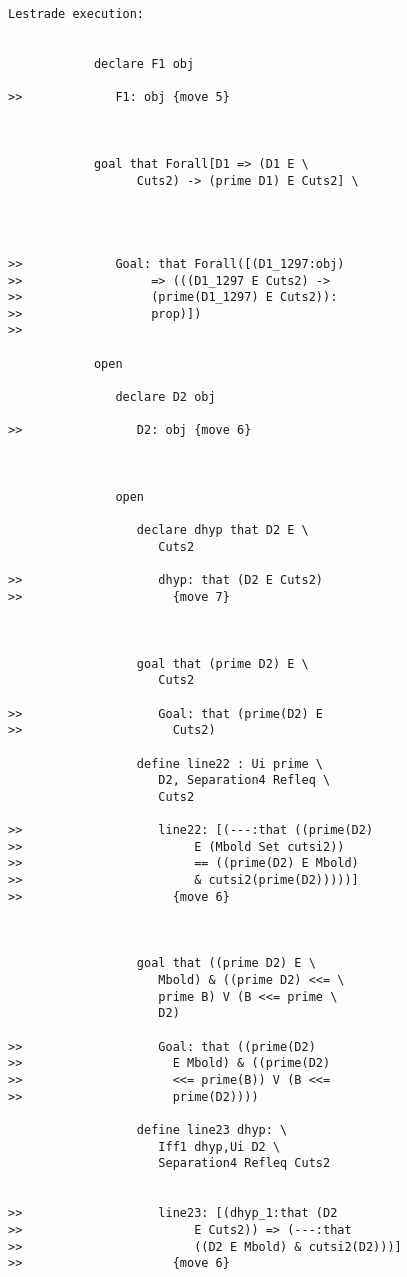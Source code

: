 \documentclass[12pt]{article}
\begin{document}
\begin{verbatim}Lestrade execution:


            declare F1 obj

>>             F1: obj {move 5}



            goal that Forall[D1 => (D1 E \
                  Cuts2) -> (prime D1) E Cuts2] \
               



>>             Goal: that Forall([(D1_1297:obj)
>>                  => (((D1_1297 E Cuts2) ->
>>                  (prime(D1_1297) E Cuts2)):
>>                  prop)])
>>               

            open

               declare D2 obj

>>                D2: obj {move 6}



               open

                  declare dhyp that D2 E \
                     Cuts2

>>                   dhyp: that (D2 E Cuts2)
>>                     {move 7}



                  goal that (prime D2) E \
                     Cuts2

>>                   Goal: that (prime(D2) E
>>                     Cuts2)

                  define line22 : Ui prime \
                     D2, Separation4 Refleq \
                     Cuts2

>>                   line22: [(---:that ((prime(D2)
>>                        E (Mbold Set cutsi2))
>>                        == ((prime(D2) E Mbold)
>>                        & cutsi2(prime(D2)))))]
>>                     {move 6}



                  goal that ((prime D2) E \
                     Mbold) & ((prime D2) <<= \
                     prime B) V (B <<= prime \
                     D2)

>>                   Goal: that ((prime(D2)
>>                     E Mbold) & ((prime(D2)
>>                     <<= prime(B)) V (B <<=
>>                     prime(D2))))

                  define line23 dhyp: \
                     Iff1 dhyp,Ui D2 \
                     Separation4 Refleq Cuts2


>>                   line23: [(dhyp_1:that (D2
>>                        E Cuts2)) => (---:that
>>                        ((D2 E Mbold) & cutsi2(D2)))]
>>                     {move 6}




\end{verbatim}
\end{document}
